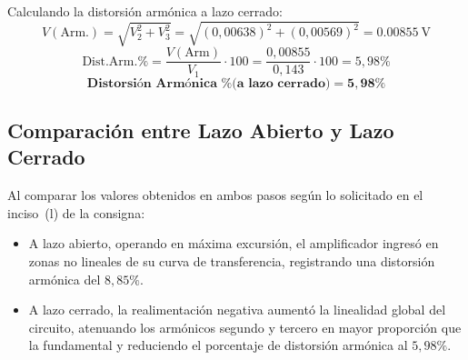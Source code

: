 Calculando la distorsión armónica a lazo cerrado:
\begin{equation}
    V(\text{Arm.}) = \sqrt{V_2^2 + V_3^2} = \sqrt{(0{,}00638)^2 + (0{,}00569)^2} = \qty{0.00855}{\volt}
    \label{eq.ej7:varm_cerrado}
\end{equation}
\begin{equation}
    \text{Dist.Arm.\%} = \frac{V(\text{Arm})}{V_1} \cdot 100 = \frac{0{,}00855}{0{,}143} \cdot 100 = 5{,}98\%
    \label{eq.ej7:thd_cerrado}
\end{equation}
\begin{equation*}
    \textbf{Distorsión Armónica \% (a lazo cerrado)} = \mathbf{5{,}98\%}
\end{equation*}

\subsection{Comparación entre Lazo Abierto y Lazo Cerrado}
Al comparar los valores obtenidos en ambos pasos según lo solicitado en el inciso~(l) de la consigna:
\begin{itemize}
    \item A lazo abierto, operando en máxima excursión, el amplificador ingresó en zonas no lineales de su curva de
    transferencia, registrando una distorsión armónica del $8{,}85\%$.
    \item A lazo cerrado, la realimentación negativa aumentó la linealidad global del circuito, atenuando los armónicos
    segundo y tercero en mayor proporción que la fundamental y reduciendo el porcentaje de distorsión armónica al $5{,}98\%$.
\end{itemize}
